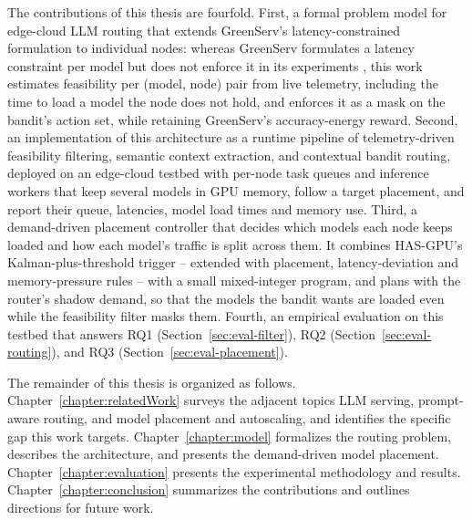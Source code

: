 The contributions of this thesis are fourfold.
First, a formal problem model for edge-cloud LLM routing that extends GreenServ's latency-constrained formulation to individual nodes: whereas GreenServ formulates a latency constraint per model but does not enforce it in its experiments \cite{greenserv_code}, this work estimates feasibility per (model, node) pair from live telemetry, including the time to load a model the node does not hold, and enforces it as a mask on the bandit's action set, while retaining GreenServ's accuracy-energy reward.
Second, an implementation of this architecture as a runtime pipeline of telemetry-driven feasibility filtering, semantic context extraction, and contextual bandit routing, deployed on an edge-cloud testbed with per-node task queues and inference workers that keep several models in GPU memory, follow a target placement, and report their queue, latencies, model load times and memory use.
Third, a demand-driven placement controller that decides which models each node keeps loaded and how each model's traffic is split across them. It combines HAS-GPU's Kalman-plus-threshold trigger -- extended with placement, latency-deviation and memory-pressure rules -- with a small mixed-integer program, and plans with the router's shadow demand, so that the models the bandit wants are loaded even while the feasibility filter masks them.
Fourth, an empirical evaluation on this testbed that answers RQ1 (Section~\ref{sec:eval-filter}), RQ2 (Section~\ref{sec:eval-routing}), and RQ3 (Section~\ref{sec:eval-placement}).

The remainder of this thesis is organized as follows.
Chapter~\ref{chapter:relatedWork} surveys the adjacent topics LLM serving, prompt-aware routing, and model placement and autoscaling, and identifies the specific gap this work targets.
Chapter~\ref{chapter:model} formalizes the routing problem, describes the architecture, and presents the demand-driven model placement.
Chapter~\ref{chapter:evaluation} presents the experimental methodology and results.
Chapter~\ref{chapter:conclusion} summarizes the contributions and outlines directions for future work.
